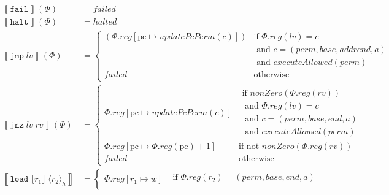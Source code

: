 \documentclass{article}
\newcommand{\update}[2]{[#1 \mapsto #2]}%
\newcommand{\sem}[1]{\left\llbracket #1 \right\rrbracket}
\newcommand{\var}[1]{\mathit{#1}}
\newcommand{\rv}{\var{rv}}
\newcommand{\lv}{\var{lv}}
\newcommand{\pcreg}{\mathrm{pc}}
\newcommand{\addr}{\var{a}}
\newcommand{\start}{\var{base}}
\newcommand{\addrend}{\var{end}}
\newcommand{\reg}{\var{reg}}
\newcommand{\perm}{\var{perm}}
\newcommand{\failed}{\mathit{failed}}
\newcommand{\halted}{\mathit{halted}}
\newcommand{\plainfun}[1]{\mathit{#1}}
\newcommand{\updatePcPerm}[1]{\plainfun{updatePcPerm}(#1)}
\newcommand{\executeAllowed}[1]{\plainfun{executeAllowed}(#1)}
\newcommand{\nonZero}[1]{\plainfun{nonZero}(#1)}
\newcommand{\refreg}[1]{\lfloor #1 \rfloor}
\newcommand{\refheap}[1]{\langle #1 \rangle_h}
\newcommand{\fail}{\instr{fail}}
\newcommand{\halt}{\instr{halt}}
\newcommand{\instr}[1]{\mathtt{#1}}
\newcommand{\oneinstr}[2]{\instr{#1} \; #2}
\newcommand{\jmp}[1]{\oneinstr{jmp}{#1}}
\newcommand{\twoinstr}[3]{\instr{#1} \; #2 \; #3}
\newcommand{\jnz}[2]{\twoinstr{jnz}{#1}{#2}}
\newcommand{\load}[2]{\twoinstr{load}{#1}{#2}}
\begin{document}
\begin{align*}
  \sem{\fail}(\Phi)     & = \failed \\
  \sem{\halt}(\Phi)     & = \halted \\
  \sem{\jmp{\lv}}(\Phi) & = \begin{cases}
                            (\Phi.\reg\update{\pcreg}{\updatePcPerm{c}}) & \text{if }\Phi.reg(lv) = c \\
                                                                         & \text{  and }c=(\perm,\start,addrend,\addr)\\
                                                                         & \text{  and }\executeAllowed{\perm}\\
                            \failed & \text{otherwise }
                            \end{cases} \\
  \sem{\jnz{\lv}{\rv}}(\Phi) & = \begin{cases}
                            \Phi.\reg\update{\pcreg}{\updatePcPerm{\var{c}}} &
                            \begin{array}{l}
                              \text{if $\nonZero{\Phi.\reg(\rv)}$} \\ 
                              \text{  and $\Phi.reg(lv) = c$} \\
                              \text{  and $c=(\perm,\start,\addrend,\addr)$}\\
                              \text{  and $\executeAllowed{\perm}$}
                            \end{array}
                            \\ %
                            \Phi.\reg\update{\pcreg}{\Phi.\reg(\pcreg) + 1} & \text{if not $\nonZero{\Phi.\reg(\rv)}$}\\
                            \failed & \text{otherwise }
                            \end{cases} \\
 \sem{\load{\refreg{r_1}}{\refheap{r_2}}} & =
                                 \begin{cases}
                                   \Phi.\reg\update{r_1}{\var{w}} &
                                   \begin{array}{l}
                                     \text{if }\Phi.\reg(r_2) = (\perm,\start,\addrend,\addr)\\

\end{array}
\end{cases}
\end{align*}
\end{document}

